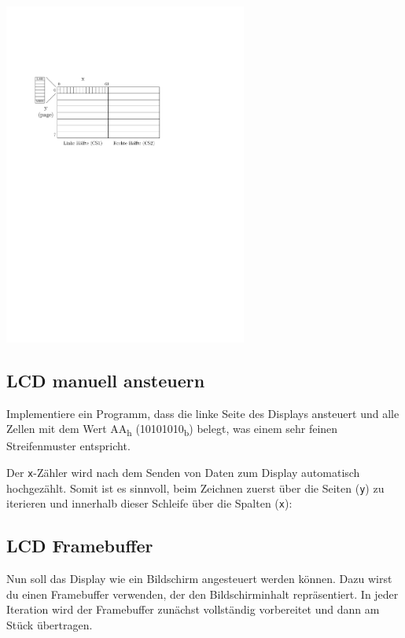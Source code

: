 \begin{center}
	\includegraphics[width=0.6\textwidth]{figures/display_aufbau}
\end{center}

\subsection{LCD manuell ansteuern}

Implementiere ein Programm, dass die linke Seite des Displays ansteuert und alle Zellen mit dem Wert AA\textsubscript{h} (10101010\textsubscript{b}) belegt, was einem sehr feinen Streifenmuster entspricht.

Der \lstinline{x}-Zähler wird nach dem Senden von Daten zum Display automatisch hochgezählt.
Somit ist es sinnvoll, beim Zeichnen zuerst über die Seiten (\lstinline{y}) zu iterieren und innerhalb dieser Schleife über die Spalten (\lstinline{x}):



\subsection{LCD Framebuffer}
Nun soll das Display wie ein Bildschirm angesteuert werden können.
Dazu wirst du einen Framebuffer verwenden, der den Bildschirminhalt repräsentiert.
In jeder Iteration wird der Framebuffer zunächst vollständig vorbereitet und dann am Stück übertragen.

